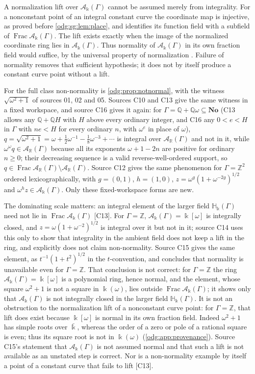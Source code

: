 \documentclass[11pt,oneside]{article}
\numberwithin{equation}{section}
\theoremstyle{definition}
\theoremstyle{remark}
\newcommand{\No}{\mathbf{No}}
\newcommand{\Z}{\mathbb Z}
\newcommand{\Q}{\mathbb Q}
\newcommand{\R}{\mathbb R}
\newcommand{\Frac}{\operatorname{Frac}}
\newcommand{\src}[1]{\textup{\textsf{\small[#1]}}}
\newcommand{\crH}{\mathbb H_\Bbbk(\Gamma)}
\newcommand{\crA}{\mathcal A_\Bbbk(\Gamma)}
\begin{document}
A normalization lift over $\crA$ cannot be assumed merely from integrality.
For a nonconstant point of an integral constant curve the coordinate map is
injective, as proved before \cref{odg:sg:lem:place}, and identifies its function
field with a subfield of $\Frac\crA$. The lift exists exactly when the image
of the normalized coordinate ring lies in $\crA$. Thus normality of $\crA$
in its own fraction field would suffice, by the universal property of
normalization \cite[Lemma 29.55.5(4)]{StacksNormal}. Failure of normality
removes that sufficient hypothesis; it does not by itself produce a constant
curve point without a lift.

For the full class non-normality is \cref{odg:prop:notnormal}, with the witness
$\sqrt{\omega^2+1}$ of sources 01, 02 and 05. Sources C10 and C13 give the same
witness in a fixed workspace, and source C16 gives it again: for
$\Gamma=\Q+\Q\omega\subseteq\No$ (C13 allows any $\Q+\Q H$ with $H$ above every ordinary
integer, and C16 any $0<e<H$ in $\Gamma$ with $ne<H$ for every ordinary $n$, with
$\omega^e$ in place of $\omega$),
$q=\sqrt{\omega^2+1}=\omega+\tfrac12\omega^{-1}-\tfrac18\omega^{-3}+\cdots$ is integral
over $\mathcal A_\R(\Gamma)$ and not in it, while $\omega^\omega q\in\mathcal A_\R(\Gamma)$
because all its exponents $\omega+1-2n$ are positive for ordinary $n\ge0$;
their decreasing sequence is a valid reverse-well-ordered support, so
$q\in\Frac\mathcal A_\R(\Gamma)\setminus\mathcal A_\R(\Gamma)$. Source C12 gives the
same phenomenon for $\Gamma=\Z^2$ ordered lexicographically, with $g=(0,1)$,
$h=(1,0)$, $z=\omega^g(1+\omega^{-2g})^{1/2}$ and $\omega^hz\in\crA$. Only these
fixed-workspace forms are new.

The dominating scale matters: an integral element of
the larger field $\crH$ need not lie in $\Frac\crA$ \src{C13}. For $\Gamma=\Z$,
$\crA=\Bbbk[\omega]$ is integrally closed, and
$z=\omega(1+\omega^{-2})^{1/2}$ is integral over it but not in it; source C14 uses
this only to show that integrality in the ambient field does not keep a lift in the
ring, and explicitly does not claim non-normality. Source C15 gives the same element, as
$t^{-1}(1+t^2)^{1/2}$ in the $t$-convention, and concludes that normality is unavailable
even for $\Gamma=\Z$. That conclusion is not correct: for $\Gamma=\Z$ the ring
$\crA=\Bbbk[\omega]$ is a polynomial ring, hence normal, and the element, whose square
$\omega^2+1$ is not a square in $\Bbbk(\omega)$, lies outside $\Frac\crA$; it shows only
that $\crA$ is not integrally closed in the larger field $\crH$. It is
not an obstruction to the normalization lift of a nonconstant curve point:
for $\Gamma=\Z$, that lift does exist because $\Bbbk[\omega]$ is normal
in its own fraction field. Indeed $\omega^2+1$ has simple roots over
$\bar\Bbbk$, whereas the order of a zero or pole of a rational square is
even; thus its square root is not in $\Bbbk(\omega)$
(\cref{odg:app:provenance}). Source C15's
statement that $\crA$ is not assumed normal and that such a lift is not available as an
unstated step is correct. Nor is a non-normality example
by itself a point of a constant curve that fails to lift \src{C13}.
\end{document}
